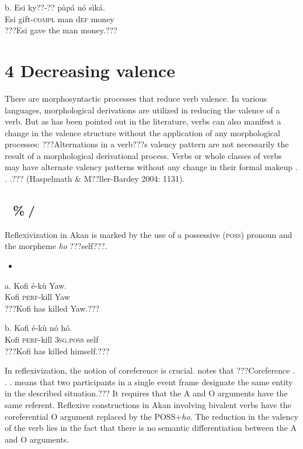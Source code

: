 \documentclass[output=paper]{langsci/langscibook}
\begin{document}
\gll  b.  Esi  ky??-??    p\`{a}p\'{a}  n\'{o}   s\`{i}k\'{a}.\\
       Esi  gift-\textsc{compl}  man  d\textsc{ef}  money\\
\glt   ???Esi gave the man money.???
\z

\chapter[4   Decreasing valence ]{4   Decreasing valence }

There are morphosyntactic processes that reduce verb valence. In various languages, morphological derivations are utilized in reducing the valence of a verb. But as has been pointed out in the literature, verbs can also manifest a change in the valence structure without the application of any morphological processes: ???Alternations in a verb???s valency pattern are not necessarily the result of a morphological derivational process. Verbs or whole classes of verbs may have alternate valency patterns without any change in their formal makeup . . .??? (Haspelmath \& M??ller-Bardey 2004: 1131).

\section{ \%/}

Reflexivization in Akan is marked by the use of a possessive (\textsc{poss}) pronoun and the morpheme \emph{ho} ???self???.

\begin{itemize}
\item \end{itemize}
\gll a.  Kofi  \'{e}-k\`{u}    Yaw.\\
       Kofi  \textsc{perf}{}-kill  Yaw\\
\glt ???Kofi has killed Yaw.???
\z

\gll  b.  Kofi    \'{e}-k\`{u}    n\'{o}    h\'{o}.\\
       Kofi    \textsc{perf}{}-kill  \textsc{3sg.poss}  self\\
\glt ???Kofi has killed himself.???
\z

In reflexivization, the notion of coreference is crucial. \citet[44]{Kemmer1993} notes that ???Coreference . . .  means that two participants in a single event frame designate the same entity in the described situation.???  It requires that the A and O arguments have the same referent. Reflexive constructions in Akan involving bivalent verbs have the coreferential O argument replaced by the POSS+\emph{ho}.  The reduction in the valency of the verb lies in the fact that there is no semantic differentiation between the A and O arguments. 
\end{document}
